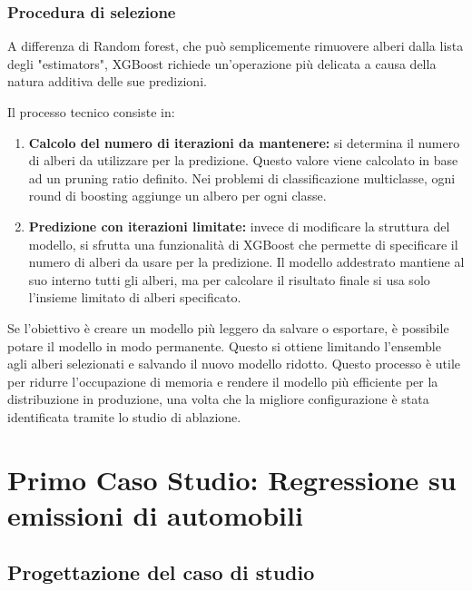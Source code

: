 \documentclass[a4paper,12pt]{report}
\begin{document}
	\subsection{Procedura di selezione}
	A differenza di Random forest, che può semplicemente rimuovere alberi dalla lista degli "estimators", XGBoost richiede un'operazione più delicata a causa della natura additiva delle sue predizioni.
	
	Il processo tecnico consiste in:
	\begin{enumerate}
		\item \textbf{Calcolo del numero di iterazioni da mantenere:} si determina il numero di alberi da utilizzare per la predizione. Questo valore viene calcolato in base ad un pruning ratio definito. Nei problemi di classificazione multiclasse, ogni round di boosting aggiunge un albero per ogni classe.
		\item \textbf{Predizione con iterazioni limitate:} invece di modificare la struttura del modello, si sfrutta una funzionalità di XGBoost che permette di specificare il numero di alberi da usare per la predizione. Il modello addestrato mantiene al suo interno tutti gli alberi, ma per calcolare il risultato finale si usa solo l'insieme limitato di alberi specificato.
	\end{enumerate}
	
	Se l'obiettivo è creare un modello più leggero da salvare o esportare, è possibile potare il modello in modo permanente. Questo si ottiene limitando l'ensemble agli alberi selezionati e salvando il nuovo modello ridotto. Questo processo è utile per ridurre l'occupazione di memoria e rendere il modello più efficiente per la distribuzione in produzione, una volta che la migliore configurazione è stata identificata tramite lo studio di ablazione.
	
	\chapter{Primo Caso Studio: Regressione su emissioni di automobili}
	
	\section{Progettazione del caso di studio}
	
\end{document}
